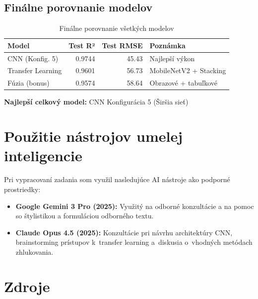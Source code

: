 \documentclass[a4paper, 12pt]{article}
\begin{document}
\subsection{Finálne porovnanie modelov}

\begin{table}[H]
\centering
\begin{tabular}{lrrl}
\toprule
\textbf{Model} & \textbf{Test R²} & \textbf{Test RMSE} & \textbf{Poznámka} \\
\midrule
CNN (Konfig. 5) & 0.9744 & 45.43 & Najlepší výkon \\
Transfer Learning & 0.9601 & 56.73 & MobileNetV2 + Stacking \\
Fúzia (bonus) & 0.9574 & 58.64 & Obrazové + tabuľkové \\
\bottomrule
\end{tabular}
\caption{Finálne porovnanie všetkých modelov}
\end{table}

\textbf{Najlepší celkový model:} CNN Konfigurácia 5 (Širšia sieť)

\clearpage

\section*{Použitie nástrojov umelej inteligencie}

Pri vypracovaní zadania som využil nasledujúce AI nástroje ako podporné prostriedky:
\begin{itemize}
    \item \textbf{Google Gemini 3 Pro (2025):} Využitý na odborné konzultácie a na pomoc so štylistikou a formuláciou odborného textu.
\end{itemize}
\begin{itemize}
    \item \textbf{Claude Opus 4.5 (2025):} Konzultácie pri návrhu architektúry CNN, brainstorming prístupov k~transfer learning a~diskusia o~vhodných metódach zhlukovania.
\end{itemize}

\section*{Zdroje}
\end{document}
